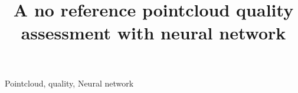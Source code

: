 \documentclass[lettersize,journal]{IEEEtran}
\begin{document}
\title{A no reference pointcloud quality assessment with neural network}

\author{}
\author{}



\maketitle

\begin{abstract}

\end{abstract}

\begin{IEEEkeywords}
Pointcloud, quality, Neural network
\end{IEEEkeywords}





\end{document}
